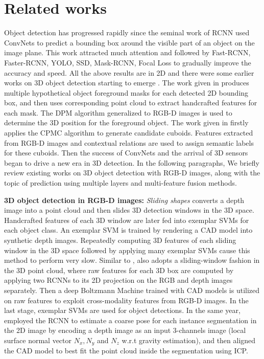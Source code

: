 \documentclass[10pt,twocolumn,letterpaper]{article}
\begin{document}
	
	\section{Related works}
	Object detection has progressed rapidly since the seminal work of RCNN \cite{R2014rcnn} used ConvNets to predict a bounding box around the visible part of an object on the image plane. This work attracted much attention and followed by Fast-RCNN\cite{R2015Fastrcnn}, Faster-RCNN\cite{He2014fasterrcnn}, YOLO\cite{J2016YOLO, J2017YOLO9000}, SSD\cite{Wei2016SSD}, Mask-RCNN\cite{He2017maskrcnn},  Focal Loss\cite{He2017focal} to gradually improve the accuracy and speed. All the above results are in 2D and there were some earlier works on 3D object detection starting to emerge \cite{K2013accurate, D2013Holistic}. The work given in \cite{K2013accurate} produces multiple hypothetical object foreground masks for each detected 2D bounding box,  and then uses corresponding  point cloud to extract handcrafted features for each mask. The DPM algorithm\cite{DPM2010} generalized to RGB-D images is used to determine the 3D position for the foreground object. The work given in \cite{D2013Holistic} firstly  applies  the CPMC algorithm\cite{CPMC2012} to generate candidate cuboids.  Features extracted from  RGB-D images and  contextual relations are used to assign semantic labels for these cuboids. Then the success of ConvNets and the arrival of 3D sensors began to drive a new era in 3D detection. In the following paragraphs, We briefly review existing works on 3D object detection with RGB-D images, along with the topic of prediction using multiple layers and multi-feature fusion methods.\par
	\vspace{1mm}
	\noindent\textbf{3D object detection in RGB-D images:} \emph{Sliding shapes} \cite{Surans2014sliding} converts a depth image into a point cloud and then slides 3D detection windows in the 3D space. Handcrafted features of each 3D window are later fed into exemplar SVMs for each object class. An exemplar SVM is trained by rendering a CAD model into synthetic depth images. Repeatedly computing 3D features of each sliding window in the 3D space followed by applying many exemplar SVMs cause this method to perform very slow. Similar to \cite{Surans2014sliding}, \cite{Wei2015DBM} also adopts a sliding-window fashion in the 3D point cloud, where raw features for each 3D box are computed by applying two RCNNs to its 2D projection on the RGB and depth images separately. Then a deep Boltzmann Machine trained with CAD models is utilized on raw features to exploit cross-modality features from RGB-D images. In the last stage, exemplar SVMs are used for object detections. In the same year, \cite{Saurabh2015depthrcnn} employed the RCNN to estimate a coarse pose for each instance segmentation in the 2D image by encoding a depth image as an input 3-channels image (local surface normal vector $N_{x}, N_{y}$ and $N_{z}$ w.r.t gravity estimation), and then aligned the CAD model to best fit the point cloud inside the segmentation using ICP. \par
	
\end{document}
